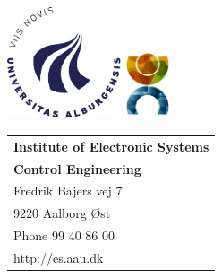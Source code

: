 \thispagestyle{empty}
\noindent
\begin{minipage}[l]{0.50\textwidth}
	\centering
	\includegraphics[width=3.35cm]{frontmatter/AAU_LAT_CIRCLE_blue_rgb}
	\includegraphics[width=1.35cm]{frontmatter/ca-logo.pdf}
\end{minipage}
\begin{minipage}[r]{0.50\textwidth}

\noindent
	\begin{tabular}{l}
		{\textsf{\small \textbf{Institute of Electronic Systems}}}\\
		{\textsf{\small \textbf{Control Engineering}}} \\
		{\textsf{\small Fredrik Bajers vej 7}} \\
		{\textsf{\small 9220 Aalborg \O st}} \\
		{\textsf{\small Phone 99 40 86 00}} \\
		{\textsf{\small http://es.aau.dk}}
	\end{tabular}
\end{minipage}


